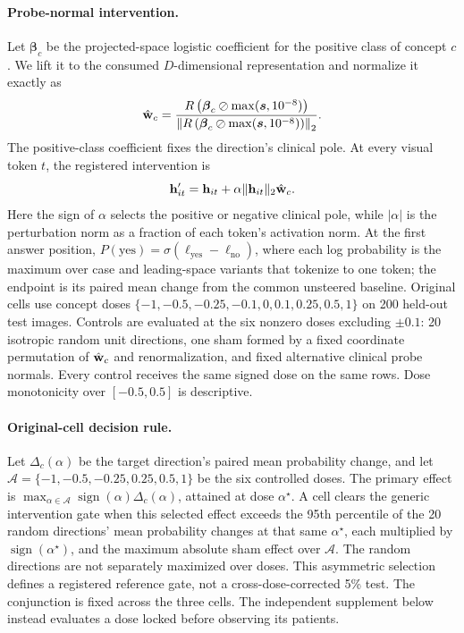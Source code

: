 \documentclass{article}
\begin{document}
\paragraph{Probe-normal intervention.}
Let $\boldsymbol\beta_c$ be the projected-space logistic coefficient for the positive class of concept $c$. We lift it to the consumed $D$-dimensional representation and normalize it exactly as
\begin{equation}
\hat{\mathbf{w}}_c = \frac{R\left(\boldsymbol\beta_c\oslash\max(\boldsymbol{s},10^{-8})\right)}{\left\lVert R\left(\boldsymbol\beta_c\oslash\max(\boldsymbol{s},10^{-8})\right)\right\rVert_2}.
\label{eq:seed-lift}
\end{equation}
The positive-class coefficient fixes the direction's clinical pole. At every visual token $t$, the registered intervention is
\begin{equation}
\mathbf{h}'_{it}=\mathbf{h}_{it}+\alpha\lVert\mathbf{h}_{it}\rVert_2\hat{\mathbf{w}}_c.
\label{eq:seed-intervention}
\end{equation}
Here the sign of $\alpha$ selects the positive or negative clinical pole, while $|\alpha|$ is the perturbation norm as a fraction of each token's activation norm. At the first answer position, $P(\mathrm{yes})=\sigma(\ell_{\mathrm{yes}}-\ell_{\mathrm{no}})$, where each log probability is the maximum over case and leading-space variants that tokenize to one token; the endpoint is its paired mean change from the common unsteered baseline. Original cells use concept doses $\{-1,-0.5,-0.25,-0.1,0,0.1,0.25,0.5,1\}$ on 200 held-out test images. Controls are evaluated at the six nonzero doses excluding $\pm0.1$: 20 isotropic random unit directions, one sham formed by a fixed coordinate permutation of $\hat{\mathbf{w}}_c$ and renormalization, and fixed alternative clinical probe normals. Every control receives the same signed dose on the same rows. Dose monotonicity over $[-0.5,0.5]$ is descriptive.

\paragraph{Original-cell decision rule.}
Let $\Delta_c(\alpha)$ be the target direction's paired mean probability change, and let $\mathcal A=\{-1,-0.5,-0.25,0.25,0.5,1\}$ be the six controlled doses. The primary effect is $\max_{\alpha\in\mathcal A}\operatorname{sign}(\alpha)\Delta_c(\alpha)$, attained at dose $\alpha^\star$. A cell clears the generic intervention gate when this selected effect exceeds the 95th percentile of the 20 random directions' mean probability changes at that same $\alpha^\star$, each multiplied by $\operatorname{sign}(\alpha^\star)$, and the maximum absolute sham effect over $\mathcal A$. The random directions are not separately maximized over doses. This asymmetric selection defines a registered reference gate, not a cross-dose-corrected 5\% test. The conjunction is fixed across the three cells. The independent supplement below instead evaluates a dose locked before observing its patients.
\end{document}
